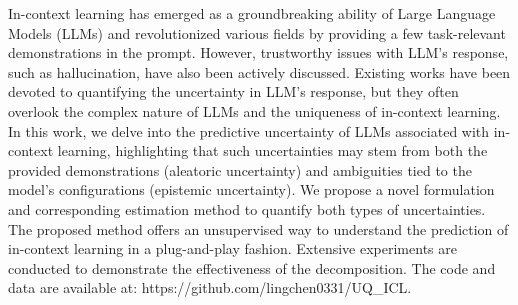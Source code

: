 In-context learning has emerged as a groundbreaking ability of Large Language Models (LLMs) and revolutionized various fields by providing a few task-relevant demonstrations in the prompt. However, trustworthy issues with LLM's response, such as hallucination, have also been actively discussed. Existing works have been devoted to quantifying the uncertainty in LLM's response, but they often overlook the complex nature of LLMs and the uniqueness of in-context learning. In this work, we delve into the predictive uncertainty of LLMs associated with in-context learning, highlighting that such uncertainties may stem from both the provided demonstrations (aleatoric uncertainty) and ambiguities tied to the model's configurations (epistemic uncertainty). We propose a novel formulation and corresponding estimation method to quantify both types of uncertainties. The proposed method offers an unsupervised way to understand the prediction of in-context learning in a plug-and-play fashion. Extensive experiments are conducted to demonstrate the effectiveness of the decomposition. The code and data are available at: https://github.com/lingchen0331/UQ\_ICL.